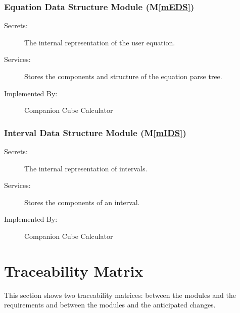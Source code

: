 \documentclass[12pt, titlepage]{article}
\newcommand{\mref}[1]{M\ref{#1}}
\newcommand{\progname}{Companion Cube Calculator} %
\begin{document}
\subsubsection{Equation Data Structure Module (\mref{mEDS})}

\begin{description}
	\item[Secrets:]The internal representation of the user equation.
	\item[Services:]Stores the components and structure of the equation parse 
	tree.
	\item[Implemented By:] \progname{}
\end{description}

\subsubsection{Interval Data Structure Module (\mref{mIDS})}

\begin{description}
	\item[Secrets:]The internal representation of intervals.
	\item[Services:]Stores the components of an interval.
	\item[Implemented By:] \progname{}
\end{description}

\section{Traceability Matrix} \label{SecTM}

This section shows two traceability matrices: between the modules and the
requirements and between the modules and the anticipated changes.
\end{document}
